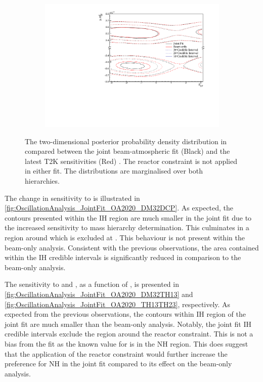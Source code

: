 \begin{figure}[h]
  \begin{subfigure}[t]{0.98\textwidth}
    \includegraphics[width=\textwidth, trim={0mm 0mm 0mm 0mm}, clip,page=1]{Figures/OA/JointFit_OA2020_Comp/ContourComparison_2D_dcp_dm32_BH_1_woRC_UnSmeared_CredibleInterval.pdf}
  \end{subfigure}
  \caption{The two-dimensional posterior probability density distribution in  compared between the joint beam-atmospheric fit (Black) and the latest T2K sensitivities (Red) \cite{Dunne2020-uf, t2k_tn_393}. The reactor constraint is not applied in either fit. The distributions are marginalised over both hierarchies.}
  \label{fig:OscillationAnalysis_JointFit_OA2020_DM32DCP}
\end{figure}

The change in sensitivity to  is illustrated in \autoref{fig:OscillationAnalysis_JointFit_OA2020_DM32DCP}. As expected, the contours presented within the IH region are much smaller in the joint fit due to the increased sensitivity to mass hierarchy determination. This culminates in a region around  which is excluded at \quickmath{3\sigma}. This behaviour is not present within the beam-only analysis. Consistent with the previous observations, the area contained within the IH credible intervals is significantly reduced in comparison to the beam-only analysis.

The sensitivity to  and , as a function of , is presented in \autoref{fig:OscillationAnalysis_JointFit_OA2020_DM32TH13} and \autoref{fig:OscillationAnalysis_JointFit_OA2020_TH13TH23}, respectively. As expected from the previous observations, the  contours within IH region of the joint fit are much smaller than the beam-only analysis. Notably, the joint fit IH \quickmath{1\sigma} credible intervals exclude the region around the reactor constraint. This is not a bias from the fit as the known value for  is in the NH region. This does suggest that the application of the reactor constraint would further increase the preference for NH in the joint fit compared to its effect on the beam-only analysis.

